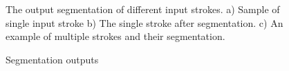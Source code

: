 \documentclass[preprint,10pt,5p,twocolumn]{elsarticle}
\begin{document}
\begin{figure}[]
	\centering
		
	\caption{Segmentation outputs} The output segmentation of different input strokes. a) Sample of single input stroke b) The single stroke after segmentation. c) An example of multiple strokes and their segmentation. %
	\label{fig:SampleSeg}
\end{figure}
\end{document}
